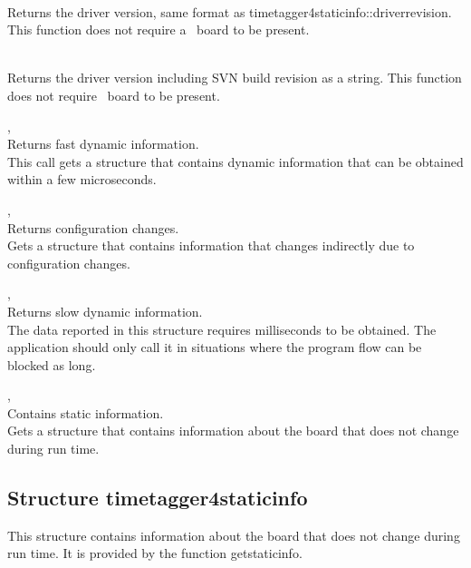 			\\
			Returns the driver version, same format as timetagger4\tu static\tu info::driver\tu revision. This function does not require a \deviceName\ board to be present.

			\\
			Returns the driver version including SVN build revision as a string. This function does not require \deviceName\ board to be present.

			, \\
			Returns fast dynamic information.\\
			This call gets a structure that contains dynamic information that can be obtained within a few microseconds.\par

			, \\
			Returns configuration changes.\\
			Gets a structure that contains information that changes indirectly due to configuration changes.\par

			, \\
			Returns slow dynamic information.\\
			The data reported in this structure requires milliseconds to be obtained. 
			The application should only call it in situations where the program flow can be blocked as long.\par

			,\\
			Contains static information.\\
			Gets a structure that contains information about the board that does not change during run time.\par

		\subsection{Structure timetagger4\tu static\tu info}

			This structure contains information about the board that does not change during run time. It is provided by the function \textsf{\prefix get\tu static\tu info}.\par

